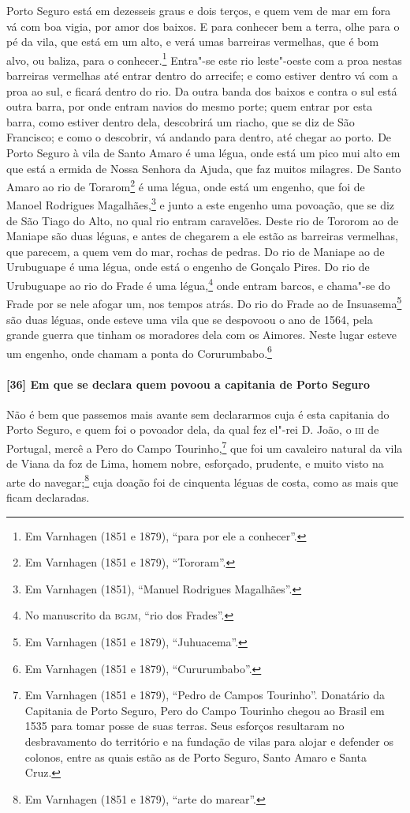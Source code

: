 Porto Seguro está em dezesseis graus e dois terços, e quem vem de mar em fora vá com boa
vigia, por amor dos baixos. E para conhecer bem a terra, olhe para o pé da vila, que está
em um alto, e verá umas barreiras vermelhas, que é bom alvo, ou baliza, para o
conhecer.\footnote{ Em Varnhagen (1851 e 1879), ``para por ele a conhecer''.} Entra"-se
este rio leste"-oeste com a proa nestas barreiras vermelhas até entrar dentro do arrecife;
e como estiver dentro vá com a proa ao sul, e ficará dentro do rio. Da outra banda dos
baixos e contra o sul está outra barra, por onde entram navios do mesmo porte; quem entrar
por esta barra, como estiver dentro dela, descobrirá um riacho, que se diz de São
Francisco; e como o descobrir, vá andando para dentro, até chegar ao porto. De Porto
Seguro à vila de Santo Amaro é uma légua, onde está um pico mui alto em que está a ermida
de Nossa Senhora da Ajuda, que faz muitos milagres. De Santo Amaro ao rio de
Torarom\footnote{ Em Varnhagen (1851 e 1879), ``Tororam''.} é uma légua, onde está um
engenho, que foi de Manoel Rodrigues Magalhães,\footnote{ Em Varnhagen (1851), ``Manuel
Rodrigues Magalhães''.} e junto a este engenho uma povoação, que se diz de São Tiago do
Alto, no qual rio entram caravelões. Deste rio de Tororom ao de Maniape são duas léguas, e
antes de chegarem a ele estão as barreiras vermelhas, que parecem, a quem vem do mar,
rochas de pedras. Do rio de Maniape ao de Urubuguape é uma légua, onde está o engenho de
Gonçalo Pires. Do rio de Urubuguape ao rio do Frade é uma légua,\footnote{ No manuscrito
da \textsc{bgjm}, ``rio dos Frades''.} onde entram barcos, e chama"-se do Frade por se nele
afogar um, nos tempos atrás. Do rio do Frade ao de Insuasema\footnote{ Em Varnhagen (1851
e 1879), ``Juhuacema''.} são duas léguas, onde esteve uma vila que se despovoou o ano de
1564, pela grande guerra que tinham os moradores dela com os Aimores. Neste lugar esteve
um engenho, onde chamam a ponta do Corurumbabo.\footnote{ Em Varnhagen (1851 e 1879),
``Cururumbabo''.}

\paragraph{[36] Em que se declara quem povoou a capitania de Porto Seguro} \quad
Não é bem que passemos mais avante sem declararmos cuja é esta capitania do Porto Seguro,
e quem foi o povoador dela, da qual fez el"-rei D. João, o \textsc{iii} de Portugal, mercê
a Pero do Campo Tourinho,\footnote{ Em Varnhagen (1851 e 1879), ``Pedro de Campos
Tourinho''. Donatário da Capitania de Porto Seguro, Pero do Campo Tourinho chegou ao
Brasil em 1535 para tomar posse de suas terras. Seus esforços resultaram no desbravamento
do território e na fundação de vilas para alojar e defender os colonos, entre as quais
estão as de Porto Seguro, Santo Amaro e Santa Cruz.} que foi um cavaleiro natural da vila
de Viana da foz de Lima, homem nobre, esforçado, prudente, e muito visto na arte do
navegar;\footnote{ Em Varnhagen (1851 e 1879), ``arte do marear''.} cuja doação foi de
cinquenta léguas de costa, como as mais que ficam declaradas.

